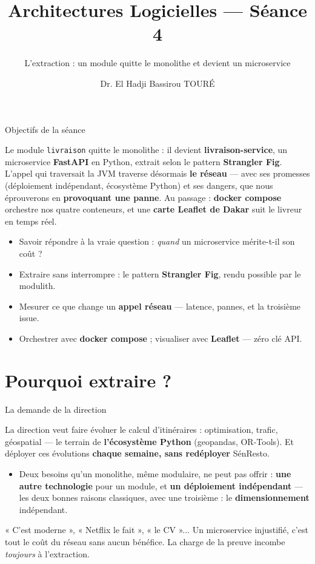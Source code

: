 \documentclass[aspectratio=169,11pt]{beamer}
\title{Architectures Logicielles — Séance 4}
\subtitle{L'extraction : un module quitte le monolithe et devient un microservice}
\author{Dr. El Hadji Bassirou TOURÉ}
\institute{Département de Mathématiques et Informatique\\ Faculté des Sciences et Techniques\\ Université Cheikh Anta Diop de Dakar}
\date{}
\begin{document}
\begin{frame}\titlepage\end{frame}

\begin{frame}{Objectifs de la séance}
\begin{ucaddef}[Contenu]
{\small Le module \texttt{livraison} quitte le monolithe : il devient \textbf{livraison-service}, un microservice \textbf{FastAPI} en Python, extrait selon le pattern \textbf{Strangler Fig}. L'appel qui traversait la JVM traverse désormais \textbf{le réseau} — avec ses promesses (déploiement indépendant, écosystème Python) et ses dangers, que nous éprouverons en \textbf{provoquant une panne}. Au passage : \textbf{docker compose} orchestre nos quatre conteneurs, et une \textbf{carte Leaflet de Dakar} suit le livreur en temps réel.}
\end{ucaddef}
\begin{itemize}\small
  \item Savoir répondre à la vraie question : \emph{quand} un microservice mérite-t-il son coût ?
  \item Extraire sans interrompre : le pattern \textbf{Strangler Fig}, rendu possible par le modulith.
  \item Mesurer ce que change un \textbf{appel réseau} — latence, pannes, et la troisième issue.
  \item Orchestrer avec \textbf{docker compose} ; visualiser avec \textbf{Leaflet} — zéro clé API.
\end{itemize}
\end{frame}

\section{Pourquoi extraire ?}

\begin{frame}{La demande de la direction}
\begin{ucadex}[Le scénario]
{\small La direction veut faire évoluer le calcul d'itinéraires : optimisation, trafic, géospatial — le terrain de \textbf{l'écosystème Python} (geopandas, OR-Tools). Et déployer ces évolutions \textbf{chaque semaine, sans redéployer} SénResto.}
\end{ucadex}
\begin{itemize}\small
  \item Deux besoins qu'un monolithe, même modulaire, ne peut pas offrir : \textbf{une autre technologie} pour un module, et \textbf{un déploiement indépendant} — les deux bonnes raisons classiques, avec une troisième : le \textbf{dimensionnement} indépendant.
\end{itemize}
\begin{ucadpiege}
{\footnotesize « C'est moderne », « Netflix le fait », « le CV »... Un microservice injustifié, c'est tout le coût du réseau sans aucun bénéfice. La charge de la preuve incombe \emph{toujours} à l'extraction.}
\end{ucadpiege}
\end{frame}
\end{document}
